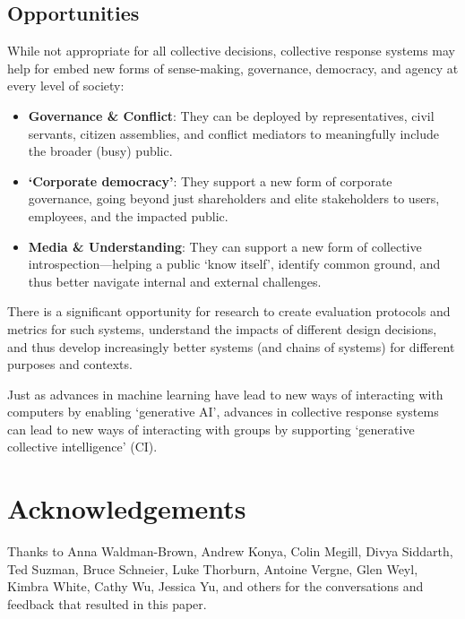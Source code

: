\documentclass[sigconf,authorversion,nonacm,linkcolor=blue,colorlinks]{acmart}
\def\tightlist{} %
\begin{document}
%






\subsection{Opportunities}
While not appropriate for all collective decisions, collective response systems may help for embed new forms of sense-making, governance, democracy, and agency at every level of society:

\begin{itemize}
\tightlist
\item
  \textbf{Governance \& Conflict}: They can be deployed by representatives, civil servants, citizen assemblies, and conflict mediators to meaningfully include the broader (busy) public.
\item
  \textbf{`Corporate democracy'}: They support a new form of corporate governance, going beyond just shareholders and elite stakeholders to users, employees, and the impacted public.
\item
  \textbf{Media \& Understanding}: They can support a new form of collective introspection---helping a public `know itself', identify common ground, and thus better navigate internal and external challenges.
\end{itemize}

There is a significant opportunity for research to create evaluation protocols and metrics for such systems, understand the impacts of different design decisions, and thus develop increasingly better systems (and chains of systems) for different purposes and contexts. 

Just as advances in machine learning have lead to new ways of interacting with computers by enabling `generative AI', advances in collective response systems can lead to new ways of interacting with groups by supporting `generative collective intelligence' (CI). 

%

\section*{Acknowledgements}
Thanks to Anna Waldman-Brown, Andrew Konya, Colin Megill, Divya Siddarth, Ted Suzman, Bruce Schneier, Luke Thorburn, Antoine Vergne, Glen Weyl, Kimbra White, Cathy Wu, Jessica Yu, and others for the conversations and feedback that resulted in this paper.

  
\end{document}
